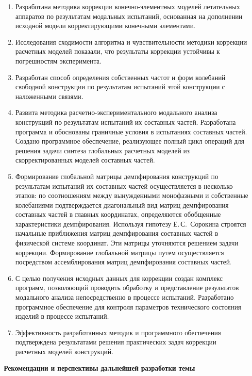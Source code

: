 
\begin{enumerate}
	\item Разработана методика коррекции конечно-элементных моделей летательных аппаратов по результатам модальных испытаний, основанная на дополнении исходной модели корректирующими конечными элементами.
	\item Исследования сходимости алгоритма и чувствительности методики коррекции расчетных моделей показали, что результаты коррекции устойчивы к погрешностям эксперимента. 
	\item Разработан способ определения собственных частот и форм колебаний свободной конструкции по результатам испытаний этой конструкции с наложенными связями.
	\item Развита методика расчетно-экспериментального модального анализа конструкций по результатам испытаний их составных частей. Разработана программа и обоснованы граничные условия в испытаниях составных частей. Создано программное обеспечение, реализующее полный цикл операций для решения задачи синтеза глобальных расчетных моделей из скорректированных моделей составных частей.
	\item Формирование глобальной матрицы демпфирования конструкций по результатам испытаний их составных частей осуществляется в несколько этапов: по соотношениям между вынужденными монофазными и собственные колебаниями подтверждается диагональный вид матриц демпфирования составных частей в главных координатах, определяются обобщенные характеристики демпфирования. Используя гипотезу Е.\,С.~Сорокина строятся начальные приближения матриц демпфирования составных частей в физической системе координат. Эти матрицы уточняются решением задачи коррекции. Формирование глобальной матрицы путем осуществляется посредством ассемблирования матриц демпфирования составных частей. 
	\item С целью получения исходных данных для коррекции создан комплекс программ, позволяющий проводить обработку и представление результатов модального анализа непосредственно в процессе испытаний. Разработано программное обеспечение для контроля параметров технического состояния изделий в процессе испытаний.
	\item Эффективность разработанных методик и программного обеспечения подтверждена результатами решения практических задач коррекции расчетных моделей конструкций.
\end{enumerate}

\textbf{Рекомендации и перспективы дальнейшей разработки темы}

